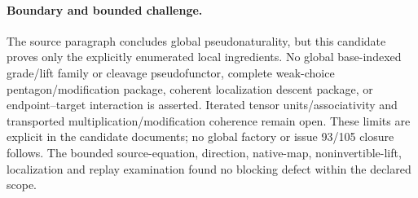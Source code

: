 \documentclass{article}
\begin{document}
\paragraph{Boundary and bounded challenge.} The source paragraph concludes global pseudonaturality, but this candidate proves only the explicitly enumerated local ingredients. No global base-indexed grade/lift family or cleavage pseudofunctor, complete weak-choice pentagon/modification package, coherent localization descent package, or endpoint--target interaction is asserted. Iterated tensor units/associativity and transported multiplication/modification coherence remain open. These limits are explicit in the candidate documents; no global factory or issue 93/105 closure follows. The bounded source-equation, direction, native-map, noninvertible-lift, localization and replay examination found no blocking defect within the declared scope.
\end{document}

